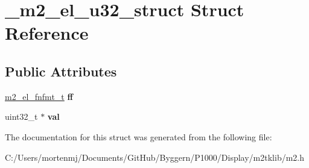 \hypertarget{struct__m2__el__u32__struct}{\section{\-\_\-m2\-\_\-el\-\_\-u32\-\_\-struct Struct Reference}
\label{struct__m2__el__u32__struct}
}
\subsection*{Public Attributes}
\begin{DoxyCompactItemize}
\item 
\hypertarget{struct__m2__el__u32__struct_a2b5d3ea6e157ae5ecedf870559a79ac2}{\hyperlink{struct__m2__el__fnfmt__struct}{m2\-\_\-el\-\_\-fnfmt\-\_\-t} {\bfseries ff}}\label{struct__m2__el__u32__struct_a2b5d3ea6e157ae5ecedf870559a79ac2}

\item 
\hypertarget{struct__m2__el__u32__struct_ab32ee2a9771d13e2368a8847add83208}{uint32\-\_\-t $\ast$ {\bfseries val}}\label{struct__m2__el__u32__struct_ab32ee2a9771d13e2368a8847add83208}

\end{DoxyCompactItemize}


The documentation for this struct was generated from the following file\-:\begin{DoxyCompactItemize}
\item 
C\-:/\-Users/mortenmj/\-Documents/\-Git\-Hub/\-Byggern/\-P1000/\-Display/m2tklib/m2.\-h\end{DoxyCompactItemize}
